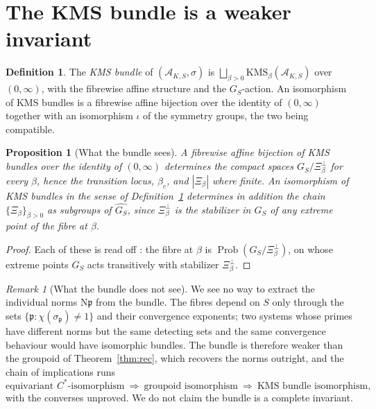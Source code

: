 \documentclass[11pt]{amsart}
\numberwithin{equation}{section}
\newtheorem{proposition}[theorem]{Proposition}
\theoremstyle{definition}
\newtheorem{definition}[theorem]{Definition}
\theoremstyle{remark}
\newtheorem{remark}[theorem]{Remark}
\newcommand{\cA}{\mathcal{A}}
\newcommand{\pp}{\mathfrak{p}}
\newcommand{\Ns}{\mathrm{N}}
\newcommand{\Prob}{\operatorname{Prob}}
\begin{document}
\section{The KMS bundle is a weaker invariant}

\begin{definition}\label{def:bundle}
The \emph{KMS bundle} of $(\cA_{K,S},\sigma)$ is
$\bigsqcup_{\beta>0}\mathrm{KMS}_\beta(\cA_{K,S})$ over $(0,\infty)$, with the fibrewise
affine structure and the $G_S$-action. An isomorphism of KMS bundles is a fibrewise affine
bijection over the identity of $(0,\infty)$ together with an isomorphism $\iota$ of the
symmetry groups, the two being compatible.
\end{definition}

\begin{proposition}[What the bundle sees]\label{prop:bundle}
A fibrewise affine bijection of KMS bundles over the identity of $(0,\infty)$ determines the
compact spaces $G_S/\Xi_\beta^\perp$ for every $\beta$, hence the transition locus, $\beta_c$,
and $|\Xi_\beta|$ where finite. An isomorphism of KMS bundles in the sense of
Definition~\ref{def:bundle} determines in addition the chain $\{\Xi_\beta\}_{\beta>0}$ as
subgroups of $\widehat{G_S}$, since $\Xi_\beta^\perp$ is the stabilizer in $G_S$ of any extreme
point of the fibre at $\beta$.
\end{proposition}

\begin{proof}
Each of these is read off \cite[Thm.~3.6]{Main}: the fibre at $\beta$ is
$\Prob(G_S/\Xi_\beta^\perp)$, on whose extreme points $G_S$ acts transitively with
stabilizer $\Xi_\beta^\perp$.
\end{proof}

\begin{remark}[What the bundle does not see]\label{rem:bundleweak}
We see no way to extract the individual norms $\Ns\pp$ from the bundle. The fibres depend on
$S$ only through the sets $\{\pp:\chi(\sigma_\pp)\ne1\}$ and their convergence exponents; two
systems whose primes have different norms but the same detecting sets and the same
convergence behaviour would have isomorphic bundles. The bundle is therefore weaker than the
groupoid of Theorem~\ref{thm:rec}, which recovers the norms outright, and the chain of
implications runs
\[
\text{equivariant }C^*\text{-isomorphism}\ \Longrightarrow\ \text{groupoid isomorphism}\ \Longrightarrow\ \text{KMS bundle isomorphism},
\]
with the converses unproved. We do not claim the bundle is a complete invariant.
\end{remark}
\end{document}
